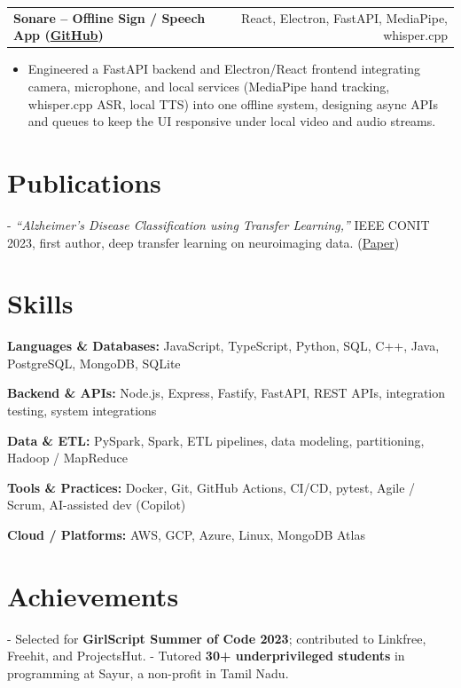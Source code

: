 \documentclass[letterpaper,11pt]{article}
\makeatletter
\newcommand{\projItem}[2]{%
  \vspace{4pt}
  \begin{tabular*}{\textwidth}{@{}l@{\extracolsep{\fill}}r@{}}
    \textbf{#1} & #2 \\
  \end{tabular*}\par\vspace{-2pt}
}
\newcommand{\skillLine}[2]{\textbf{#1:} #2\par\vspace{2pt}}
\newcommand{\inlineBlock}[1]{{\setlength{\leftskip}{0.18in}\small #1\par}}
\makeatother
\begin{document}
\projItem{Sonare -- Offline Sign / Speech App {\normalfont\small(\href{https://github.com/Deva-1903/Qualcomm-Sep25-Team-Sonare}{GitHub})}}{React, Electron, FastAPI, MediaPipe, whisper.cpp}
\begin{itemize}
  \item Engineered a FastAPI backend and Electron/React frontend integrating camera, microphone, and local services (MediaPipe hand tracking, whisper.cpp ASR, local TTS) into one offline system, designing async APIs and queues to keep the UI responsive under local video and audio streams.
\end{itemize}

\section{Publications}
\inlineBlock{- \textit{``Alzheimer's Disease Classification using Transfer Learning,''} IEEE CONIT 2023, first author, deep transfer learning on neuroimaging data. {\normalfont\small(\href{https://ieeexplore.ieee.org/document/10205760}{Paper})}}

\section{Skills}
\skillLine{Languages \& Databases}{JavaScript, TypeScript, Python, SQL, C++, Java, PostgreSQL, MongoDB, SQLite}
\skillLine{Backend \& APIs}{Node.js, Express, Fastify, FastAPI, REST APIs, integration testing, system integrations}
\skillLine{Data \& ETL}{PySpark, Spark, ETL pipelines, data modeling, partitioning, Hadoop / MapReduce}
\skillLine{Tools \& Practices}{Docker, Git, GitHub Actions, CI/CD, pytest, Agile / Scrum, AI-assisted dev (Copilot)}
\skillLine{Cloud / Platforms}{AWS, GCP, Azure, Linux, MongoDB Atlas}

\section{Achievements}
\inlineBlock{- Selected for \textbf{GirlScript Summer of Code 2023}; contributed to Linkfree, Freehit, and ProjectsHut. - Tutored \textbf{30+ underprivileged students} in programming at Sayur, a non-profit in Tamil Nadu.}
\end{document}
